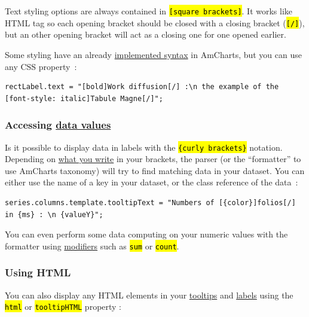 \documentclass[a4paper,12pt,twoside]{book}
\let\OldTexttt\texttt
\renewcommand{\texttt}[1]{\OldTexttt{\hl{#1}}}
\begin{document}
Text styling options are always contained in \texttt{{[}square brackets{]}}. It works like HTML tag so each opening bracket should be closed with a closing bracket (\texttt{{[}/{]}}), but an other opening bracket will act as a closing one for one opened earlier.

Some styling have an already \href{https://www.amcharts.com/docs/v4/concepts/formatters/formatting-strings/\#Visual_formatting}{implemented syntax} in AmCharts, but you can use any CSS property~:

\begin{lstlisting}
rectLabel.text = "[bold]Work diffusion[/] :\n the example of the [font-style: italic]Tabule Magne[/]";
\end{lstlisting}

				\subsubsection{Accessing \href{https://www.amcharts.com/docs/v4/concepts/data/\#Placeholders_in_on_screen_text}{data values}}\label{accessing-data-values}

Is it possible to display data in labels with the \texttt{\{curly brackets\}} notation. Depending on \href{https://www.amcharts.com/docs/v4/concepts/formatters/formatting-strings/\#Placeholder_examples}{what you write} in your brackets, the parser (or the ``formatter'' to use AmCharts taxonomy) will try to find matching data in your dataset. You can either use the name of a key in your dataset, or the class reference of the data~:

\begin{lstlisting}
series.columns.template.tooltipText = "Numbers of [{color}]folios[/] in {ms} : \n {valueY}";
\end{lstlisting}

You can even perform some data computing on your numeric values with the formatter using \href{https://www.amcharts.com/docs/v4/concepts/formatters/formatting-strings/\#Placeholders_for_numeric_values}{modifiers} such as \texttt{sum} or \texttt{count}.

				\subsubsection{Using HTML}\label{using-html}

You can also display any HTML elements in your \href{https://www.amcharts.com/docs/v4/tutorials/tooltips-with-rich-html-content/}{tooltips} and \href{https://www.amcharts.com/docs/v4/reference/label/\#html_property}{labels} using the \texttt{html} or \texttt{tooltipHTML} property :
\end{document}
